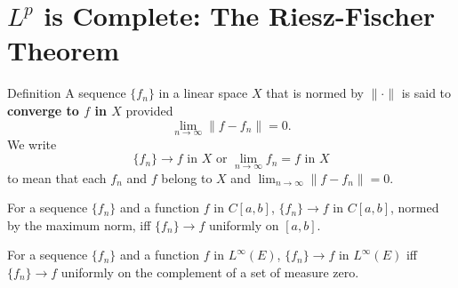 \section{$L^p$ is Complete: The Riesz-Fischer Theorem}
\begin{namedthm*}{Definition}
	A sequence $\{f_n\}$ in a linear space $X$ that is normed by $\|\cdot\|$ is said to \textbf{converge to $f$ in $X$} provided
	\[
		\lim_{n\to\infty}\|f-f_n\|=0.
	\]
	We write 
	\[
		\{f_n\}\to f\text{ in }X\text{ or }\lim_{n\to\infty}f_n=f\text{ in }X
	\]
	to mean that each $f_n$ and $f$ belong to $X$ and $\lim_{n\to\infty}\|f-f_n\|=0$.
\end{namedthm*}
For a sequence $\{f_n\}$ and a function $f$ in $C[a,b]$, $\{f_n\}\to f$ in $C[a,b]$, normed by the maximum norm, iff $\{f_n\}\to f$ uniformly on $[a,b]$.

For a sequence $\{f_n\}$ and a function $f$ in $L^\infty(E)$, $\{f_n\}\to f$ in $L^\infty(E)$ iff $\{f_n\}\to f$ uniformly on the complement of a set of measure zero.

